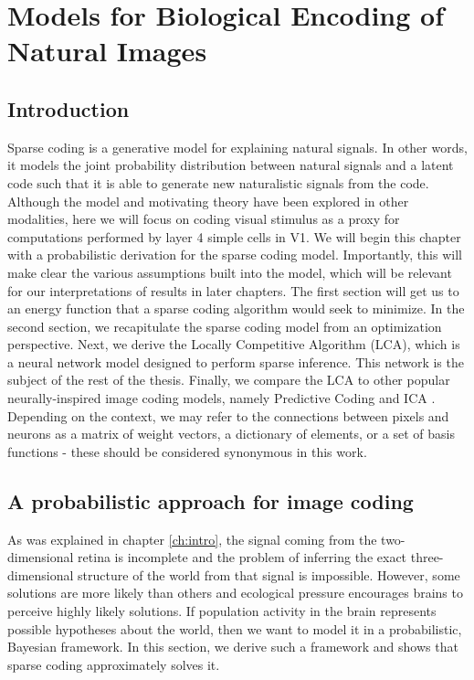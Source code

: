 \chapter{Models for Biological Encoding of Natural Images}\label{ch:lca}

\section{Introduction}
Sparse coding is a generative model for explaining natural signals. In other words, it models the joint probability distribution between natural signals and a latent code such that it is able to generate new naturalistic signals from the code. Although the model and motivating theory have been explored in other modalities, here we will focus on coding visual stimulus as a proxy for computations performed by layer 4 simple cells in V1. We will begin this chapter with a probabilistic derivation for the sparse coding model. Importantly, this will make clear the various assumptions built into the model, which will be relevant for our interpretations of results in later chapters. The first section will get us to an energy function that a sparse coding algorithm would seek to minimize. In the second section, we recapitulate the sparse coding model from an optimization perspective. Next, we derive the Locally Competitive Algorithm (LCA), which is a neural network model designed to perform sparse inference. This network is the subject of the rest of the thesis. Finally, we compare the LCA to other popular neurally-inspired image coding models, namely Predictive Coding \parencite{rao1999predictive} and ICA \parencite{bell1997independent}. Depending on the context, we may refer to the connections between pixels and neurons as a matrix of weight vectors, a dictionary of elements, or a set of basis functions - these should be considered synonymous in this work.

\section{A probabilistic approach for image coding}
As was explained in chapter \ref{ch:intro}, the signal coming from the two-dimensional retina is incomplete and the problem of inferring the exact three-dimensional structure of the world from that signal is impossible. However, some solutions are more likely than others and ecological pressure encourages brains to perceive highly likely solutions. If population activity in the brain represents possible hypotheses about the world, then we want to model it in a probabilistic, Bayesian framework. In this section, we derive such a framework and shows that sparse coding approximately solves it.

